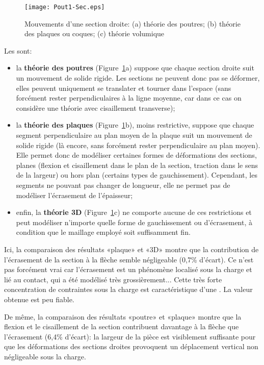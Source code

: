 \begin{figure}[ht]
\centering
\texttt{[image: Pout1-Sec.eps]}
\caption{Mouvements d'une section droite: (a) théorie des poutres;
(b) théorie des plaques ou coques; (c) théorie volumique}\label{Pout1-sec}
\end{figure}
\medskip
Les  sont:
\begin{itemize}
\item la \textbf{théorie des poutres} (Figure~\ref{Pout1-sec}a) suppose que chaque section droite suit un mouvement de solide rigide. Les sections ne peuvent donc pas se déformer, elles peuvent uniquement se translater et tourner dans l'espace (sans forcément rester perpendiculaires à la ligne moyenne, car dans ce cas on considère une théorie avec cisaillement transverse);
\item la \textbf{théorie des plaques} (Figure~\ref{Pout1-sec}b), moins restrictive, suppose que chaque segment perpendiculaire au plan moyen de la plaque suit un mouvement de solide rigide (là encore, sans forcément rester perpendiculaire au plan moyen). Elle permet donc de modéliser certaines formes de déformations des sections, planes (flexion et cisaillement dans le plan de la section, traction dans le sens de la largeur) ou hors plan (certains types de gauchissement). Cependant, les segments ne pouvant pas changer de longueur, elle ne permet pas de modéliser l'écrasement de l'épaisseur;
\item enfin, la \textbf{théorie 3D} (Figure~\ref{Pout1-sec}c) ne comporte aucune de ces restrictions et peut modéliser n'importe quelle forme de gauchissement ou d'écrasement, à condition que le maillage employé soit suffisamment fin.
\end{itemize}

\medskip
Ici, la comparaison des résultats «plaque» et «3D» montre que la contribution de l'écrasement de la section à la flèche semble négligeable (0,7\% d'écart). Ce n'est pas forcément vrai car l'écrasement est un phénomène localisé sous la charge et lié au contact, qui a été modélisé très grossièrement... Cette très forte concentration de contraintes sous la charge est caractéristique d'une . La valeur obtenue est peu fiable. 

De même, la comparaison des résultats «poutre» et «plaque» montre que la flexion et le cisaillement de la section contribuent davantage à la flèche que l'écrasement (6,4\% d'écart): la largeur de la pièce est visiblement suffisante pour que les déformations des sections droites provoquent un déplacement vertical non négligeable sous la charge.

